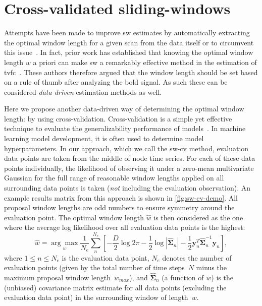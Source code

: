 \clearpage
\section{Cross-validated sliding-windows}\label{sec:cross-validated-sw}

Attempts have been made to improve \gls{sw} estimates by automatically extracting the optimal window length for a given scan from the data itself or to circumvent this issue~\parencite[see e.g.][]{Wang2014, Xu2015, Yaesoubi2018}.
In fact, prior work has established that knowing the optimal window length $w$ a priori can make \gls{sw} a remarkably effective method in the estimation of \gls{tvfc}~\parencite{Zalesky2015}.
These authors therefore argued that the window length should be set based on a rule of thumb after analyzing the \gls{bold} signal.
As such these can be considered \emph{data-driven} estimation methods as well.

Here we propose another data-driven way of determining the optimal window length: by using cross-validation.
Cross-validation is a simple yet effective technique to evaluate the generalizability performance of models~\parencite[see e.g.][section 8.2.4]{Deisenroth2019}.
In machine learning model development, it is often used to determine model hyperparameters.
%
In our approach, which we call the \gls{sw-cv} method, evaluation data points are taken from the middle of node time series.
For each of these data points individually, the likelihood of observing it under a zero-mean multivariate Gaussian for the full range of reasonable window lengths applied on all surrounding data points is taken (\emph{not} including the evaluation observation).
An example results matrix from this approach is shown in \cref{fig:sw-cv-demo}.
%
All proposal window lengths are odd numbers to ensure symmetry around the evaluation point.
The optimal window length $\hat{w}$ is then considered as the one where the average log likelihood over all evaluation data points is the highest:
\begin{equation}
  \hat{w} = \underset{w}{\arg\max} \frac{1}{N_e} \sum_{n}^{N_e} \left[ - \frac{D}{2} \log 2\pi - \frac{1}{2} \log | \hat{\mathbf{\Sigma}}_n | - \frac{1}{2} \mathbf{y}_n^T \hat{\mathbf{\Sigma}}_n^{-1} \mathbf{y}_n \right],
\end{equation}
where $1 \leq n \leq N_e$ is the evaluation data point, $N_e$ denotes the number of evaluation points (given by the total number of time steps~$N$ minus the maximum proposal window length~$w_{max}$), and $\hat{\mathbf{\Sigma}}_n$ (a function of $w$) is the (unbiased) covariance matrix estimate for all data points (excluding the evaluation data point) in the surrounding window of length~$w$.

